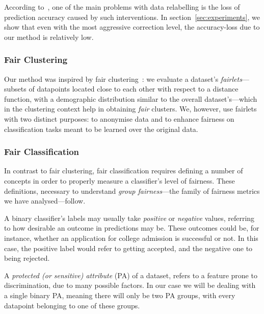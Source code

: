According to~\cite{berk2018fairness}, one of the main problems with data relabelling is the loss of prediction accuracy caused by such interventions. In section~\ref{sec:experiments}, we show that even with the most aggressive correction level, the accuracy-loss due to our method is relatively low.

\subsubsection{Fair Clustering}

Our method was inspired by fair clustering~\cite{Chierichetti:2017,backurs2019scalable}: we evaluate a dataset's \emph{fairlets}---subsets of datapoints located close to each other with respect to a distance function, with a demographic distribution similar to the overall dataset's---which in the clustering context help in obtaining \emph{fair} clusters. We, however, use fairlets with two distinct purposes: to anonymise data and to enhance fairness on classification tasks meant to be learned over the original data. 

\subsubsection{Fair Classification}

In contrast to fair clustering, fair classification requires defining a number of concepts in order to properly measure a classifier's level of fairness. These definitions, necessary to understand \emph{group fairness}---the family of fairness metrics we have analysed---follow.

\begin{definition}
  A binary classifier's labels may usually take \emph{positive} or \emph{negative} values, referring to how desirable an outcome in predictions may be. These outcomes could be, for instance, whether an application for college admission is successful or not. In this case, the positive label would refer to getting accepted, and the negative one to being rejected.
\end{definition}

\begin{definition}
  A \emph{protected (or sensitive) attribute} (PA) of a dataset, refers to a feature prone to discrimination, due to many possible factors. In our case we will be dealing with a single binary PA, meaning there will only be two PA groups, with every datapoint belonging to one of these groups.
\end{definition}

